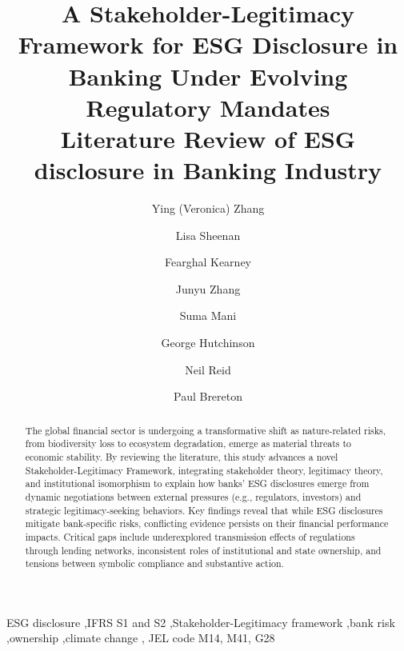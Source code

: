 \documentclass[
  authoryear]{elsarticle}
\begin{document}
\begin{frontmatter}
\title{A Stakeholder-Legitimacy Framework for ESG Disclosure in Banking
Under Evolving Regulatory Mandates \\\large{Literature Review of ESG
disclosure in Banking Industry} }

\author[1]{Ying (Veronica) Zhang%
%
}
\author[2]{Lisa Sheenan%
%
}
\author[1]{Fearghal Kearney%
%
}
\author[3]{Junyu Zhang%
%
}

\author[3]{Suma Mani%
%
}

\author[3]{George Hutchinson%
%
}

\author[3]{Neil Reid%
%
}

\author[3]{Paul Brereton%
%
}









        
\begin{abstract}
The global financial sector is undergoing a transformative shift as
nature-related risks, from biodiversity loss to ecosystem degradation,
emerge as material threats to economic stability. By reviewing the
literature, this study advances a novel Stakeholder-Legitimacy
Framework, integrating stakeholder theory, legitimacy theory, and
institutional isomorphism to explain how banks' ESG disclosures emerge
from dynamic negotiations between external pressures (e.g., regulators,
investors) and strategic legitimacy-seeking behaviors. Key findings
reveal that while ESG disclosures mitigate bank-specific risks,
conflicting evidence persists on their financial performance impacts.
Critical gaps include underexplored transmission effects of regulations
through lending networks, inconsistent roles of institutional and state
ownership, and tensions between symbolic compliance and substantive
action.
\end{abstract}





\begin{keyword}
    ESG disclosure \sep IFRS S1 and S2 \sep Stakeholder-Legitimacy
framework \sep bank risk \sep ownership \sep climate change \sep 
    JEL code M14, M41, G28
\end{keyword}
\end{frontmatter}
    
\end{document}
